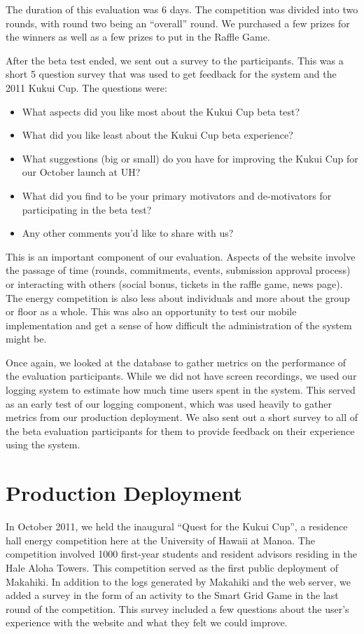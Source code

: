 The duration of this evaluation was 6 days. The competition was divided into two rounds, with round two being an ``overall'' round. We purchased a few prizes for the winners as well as a few prizes to put in the Raffle Game.

After the beta test ended, we sent out a survey to the participants. This was a short 5 question survey that was used to get feedback for the system and the 2011 Kukui Cup. The questions were:

\begin{itemize}
  \item What aspects did you like most about the Kukui Cup beta test?
  \item What did you like least about the Kukui Cup beta experience?
  \item What suggestions (big or small) do you have for improving the Kukui Cup for our October launch at UH?
  \item What did you find to be your primary motivators and de-motivators for participating in the beta test?
  \item Any other comments you'd like to share with us?
\end{itemize}

This is an important component of our evaluation. Aspects of the website involve the passage of time (rounds, commitments, events, submission approval process) or interacting with others (social bonus, tickets in the raffle game, news page). The energy competition is also less about individuals and more about the group or floor as a whole. This was also an opportunity to test our mobile implementation and get a sense of how difficult the administration of the system might be.

Once again, we looked at the database to gather metrics on the performance of the evaluation participants. While we did not have screen recordings, we used our logging system to estimate how much time users spent in the system. This served as an early test of our logging component, which was used heavily to gather metrics from our production deployment. We also sent out a short survey to all of the beta evaluation participants for them to provide feedback on their experience using the system.

\section{Production Deployment}

In October 2011, we held the inaugural ``Quest for the Kukui Cup'', a residence hall energy competition here at the University of Hawaii at Manoa. The competition involved 1000 first-year students and resident advisors residing in the Hale Aloha Towers. This competition served as the first public deployment of Makahiki. In addition to the logs generated by Makahiki and the web server, we added a survey in the form of an activity to the Smart Grid Game in the last round of the competition. This survey included a few questions about the user's experience with the website and what they felt we could improve.


